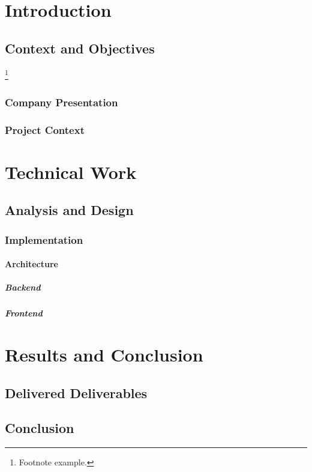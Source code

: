 \chapter{Introduction}
\section{Context and Objectives}
\lipsum[1]\footnote{Footnote example.}

\subsection{Company Presentation}
\lipsum[2]

\subsection{Project Context}
\lipsum[3]

\chapter{Technical Work}
\section{Analysis and Design}
\lipsum[4-5]

\subsection{Implementation}
\lipsum[6]

\subsubsection{Architecture}
\paragraph{Backend}
\lipsum[7]

\paragraph{Frontend}
\lipsum[8]

\chapter{Results and Conclusion}
\section{Delivered Deliverables}
\lipsum[9]

\section{Conclusion}
\lipsum[10]
